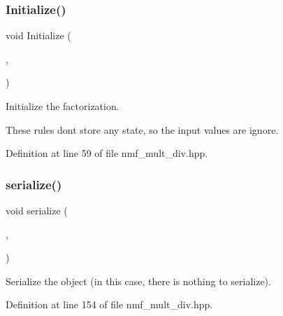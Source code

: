 \subsubsection{Initialize()}
{\footnotesize\ttfamily void Initialize (\begin{DoxyParamCaption}\item[{const Mat\+Type \&}]{,  }\item[{const size\+\_\+t}]{ }\end{DoxyParamCaption})\hspace{0.3cm}{\ttfamily [inline]}}



Initialize the factorization. 

These rules don\textquotesingle{}t store any state, so the input values are ignore. 

Definition at line 59 of file nmf\+\_\+mult\+\_\+div.\+hpp.

\mbox{\label{classmlpack_1_1amf_1_1NMFMultiplicativeDivergenceUpdate_aa2ccb5a0533a6ba0abe6dfc1f98fbafb}} 
\subsubsection{serialize()}
{\footnotesize\ttfamily void serialize (\begin{DoxyParamCaption}\item[{Archive \&}]{,  }\item[{const uint32\+\_\+t}]{ }\end{DoxyParamCaption})\hspace{0.3cm}{\ttfamily [inline]}}



Serialize the object (in this case, there is nothing to serialize). 



Definition at line 154 of file nmf\+\_\+mult\+\_\+div.\+hpp.

\mbox{\label{classmlpack_1_1amf_1_1NMFMultiplicativeDivergenceUpdate_a79b17bfdd69326a4f9f7d17c698ee6af}} 

